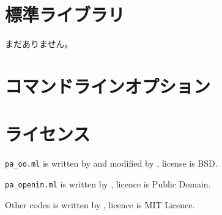 \documentclass[draft]{article}
\begin{document}
\section{標準ライブラリ}
まだありません。

\section{コマンドラインオプション}

\section{ライセンス}
\verb!pa_oo.ml! is written by  and modified by
, license is BSD.

\verb!pa_openin.ml! is written by , licence is Public Domain.

Other codes is written by , licence is MIT Licence.
\end{document}

